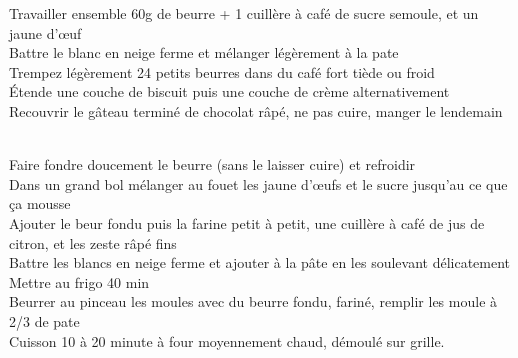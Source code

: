 \begin{minipage}[c]{\textwidth}
Travailler ensemble 60g de beurre + 1 cuillère à café de sucre semoule, et un jaune d'œuf\\
Battre le blanc en neige ferme et mélanger légèrement à la pate\\
Trempez légèrement 24 petits beurres dans du café fort tiède ou froid\\
Étende une couche de biscuit puis une couche de crème alternativement\\
Recouvrir le gâteau terminé de chocolat râpé, ne pas cuire, manger le lendemain\\
\\

\end{minipage}

\begin{minipage}[c]{\textwidth}
Faire fondre doucement le beurre (sans le laisser cuire) et refroidir\\
Dans un grand bol mélanger au fouet les jaune d'œufs et le sucre jusqu'au ce que ça mousse\\
Ajouter le beur fondu puis la farine petit à petit, une cuillère à café de jus de citron, et les zeste râpé fins\\
Battre les blancs en neige ferme et ajouter à la pâte en les soulevant délicatement\\
Mettre au frigo 40 min\\
Beurrer au pinceau les moules avec du beurre fondu, fariné, remplir les moule à 2/3 de pate\\
Cuisson 10 à 20 minute à four moyennement chaud, démoulé sur grille.\\
\\

\end{minipage}

